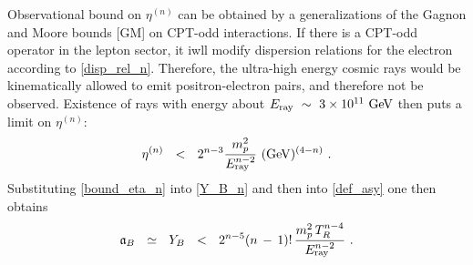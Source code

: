 \documentclass[12pt]{revtex4}
\newcommand{\Eray}{E_{\rm ray}}
\newcommand{\GeV}{{\rm GeV}}
\begin{document}
	Observational bound on $ \eta^{(n)} $ can be obtained by a generalizations
	of the Gagnon and Moore bounds [GM] on CPT-odd interactions.
	If there is a CPT-odd operator in the lepton sector, it iwll modify dispersion
	relations for the electron according to \eqref{disp_rel_n}.
	Therefore, the ultra-high energy cosmic rays would be kinematically allowed to 
	emit positron-electron pairs, and therefore not be observed.
	Existence of rays with energy about $ \Eray ~\sim~ 3\times10^{11}~\GeV $ then 
	puts a limit on $ \eta^{(n)} $:
\begin{equation}
\label{bound_eta_n}
	\eta^{(n)} ~~<~~ 
	2^{n-3} \frac{m_p^2}{\Eray^{n-2}}~(\GeV)^{(4-n)}~.
\end{equation}
%
	Substituting \eqref{bound_eta_n} into \eqref{Y_B_n} and then into 
	\eqref{def_asy} one then obtains
\begin{align}
\notag
	\mathfrak{a}_B ~~\simeq~~ Y_B
	~~<~~ 
		2^{n-5} (n\,-\,1)!\, \frac{m_p^2\, T_R^{n-4}}{\Eray^{n-2}}~.
\end{align}
\end{document}
